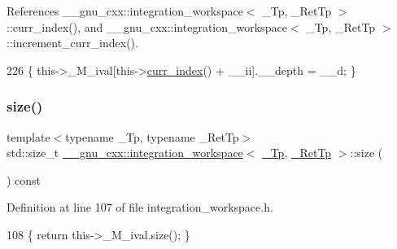 References \+\_\+\+\_\+gnu\+\_\+cxx\+::integration\+\_\+workspace$<$ \+\_\+\+Tp, \+\_\+\+Ret\+Tp $>$\+::curr\+\_\+index(), and \+\_\+\+\_\+gnu\+\_\+cxx\+::integration\+\_\+workspace$<$ \+\_\+\+Tp, \+\_\+\+Ret\+Tp $>$\+::increment\+\_\+curr\+\_\+index().


\begin{DoxyCode}
226       \{ this->\_M\_ival[this->\hyperlink{class____gnu__cxx_1_1integration__workspace_a51a384b1777615943add69f1895454f5}{curr\_index}() + \_\_ii].\_\_depth = \_\_d; \}
\end{DoxyCode}
\mbox{\label{class____gnu__cxx_1_1integration__workspace_a3672c20ecc83962eca5bad7893437b6e}} 
\subsubsection{\texorpdfstring{size()}{size()}}
{\footnotesize\ttfamily template$<$typename \+\_\+\+Tp, typename \+\_\+\+Ret\+Tp$>$ \\
std\+::size\+\_\+t \hyperlink{class____gnu__cxx_1_1integration__workspace}{\+\_\+\+\_\+gnu\+\_\+cxx\+::integration\+\_\+workspace}$<$ \hyperlink{namespace____gnu__cxx_a3b19a9c800ca194374ef9172290f7d79}{\+\_\+\+Tp}, \hyperlink{namespace____gnu__cxx_a886e03ece3d53ff7fa6c098a40f93fa5}{\+\_\+\+Ret\+Tp} $>$\+::size (\begin{DoxyParamCaption}{ }\end{DoxyParamCaption}) const\hspace{0.3cm}{\ttfamily [inline]}}



Definition at line 107 of file integration\+\_\+workspace.\+h.


\begin{DoxyCode}
108       \{ \textcolor{keywordflow}{return} this->\_M\_ival.size(); \}
\end{DoxyCode}
\mbox{\label{class____gnu__cxx_1_1integration__workspace_a01fe84e753d4654433b27bb35495c8aa}} 
